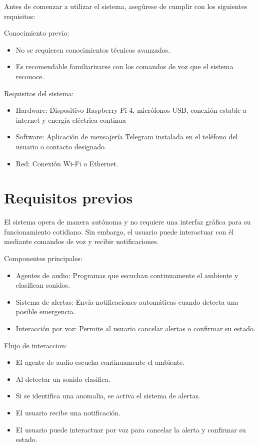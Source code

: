 Antes de comenzar a utilizar el sistema, asegúrese de cumplir con los siguientes requisitos:

Conocimiento previo:

\begin{itemize}
  \item No se requieren conocimientos técnicos avanzados.
  \item Es recomendable familiarizarse con los comandos de voz que el sistema reconoce.
\end{itemize}

Requisitos del sistema:

\begin{itemize}
  \item Hardware: Dispositivo Raspberry Pi 4, micrófonos USB, conexión estable a internet y energía eléctrica continua
  \item Software: Aplicación de mensajería Telegram instalada en el teléfono del usuario o contacto designado.
  \item Red: Conexión Wi-Fi o Ethernet.
\end{itemize}

\section*{Requisitos previos}

El sistema opera de manera autónoma y no requiere una interfaz gráfica para su funcionamiento cotidiano. Sin embargo, el usuario puede interactuar con él mediante comandos de voz y recibir notificaciones.

Componentes principales:

\begin{itemize}
  \item Agentes de audio: Programas que escuchan continuamente el ambiente y clasifican sonidos.
  \item Sistema de alertas: Envía notificaciones automáticas cuando detecta una posible emergencia.
  \item Interacción por voz: Permite al usuario cancelar alertas o confirmar su estado.
\end{itemize}

Flujo de interaccion:

\begin{itemize}
  \item El agente de audio escucha continuamente el ambiente.
  \item Al detectar un sonido clasifica.
  \item Si se identifica una anomalia, se activa el sistema de alertas.
  \item El usuario recibe una notificación.
  \item El usuario puede interactuar por voz para cancelar la alerta y confirmar su estado.
\end{itemize}

